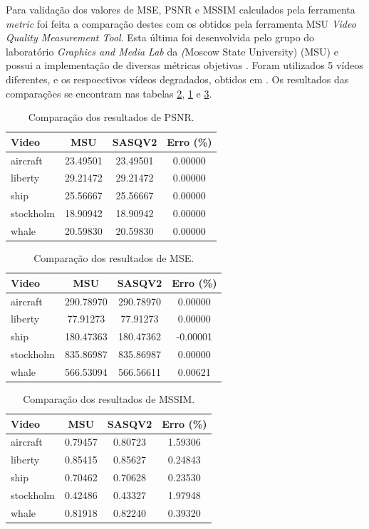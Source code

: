 Para validação dos valores de MSE, PSNR e MSSIM calculados pela ferramenta \emph{metric} foi feita a comparação destes com os obtidos pela ferramenta MSU \emph{Video Quality Measurement Tool}.
Esta última foi desenvolvida pelo grupo do laboratório \emph{Graphics and Media Lab} da \emph(Moscow State University) (MSU) e possui a implementação de diversas métricas objetivas \cite{moscowuniversity}.
Foram utilizados 5 vídeos diferentes, e os respoectivos vídeos degradados,  obtidos em \cite{}. Os resultados das comparações se encontram nas tabelas \ref{res:mse}, \ref{res:psnr} e \ref{res:mssim}.

\begin{table}[!htb]
	\centering
	\caption{Comparação dos resultados de PSNR.}
	\label{res:psnr}
	\begin{tabular}{lccc}
		\hline
		Video	 & MSU	 & SASQV2	 & Erro (\%) \\ \hline
		aircraft	 & 23.49501 & 23.49501 & 0.00000	 \\ 
		liberty	 & 29.21472 & 29.21472 & 0.00000	 \\ 
		ship	 & 25.56667 & 25.56667 & 0.00000	 \\ 
		stockholm & 18.90942 & 18.90942 & 0.00000	 \\ 
		whale	 & 20.59830 & 20.59830 & 0.00000	 \\
	\hline
	\end{tabular}
\end{table}

\begin{table}[!htb]
	\centering
	\caption{Comparação dos resultados de MSE.}
	\label{res:mse}
	\begin{tabular}{lccc}
	\hline
	Video	 & MSU	 & SASQV2	 & Erro (\%) \\ \hline
	aircraft	 & 290.78970 & 290.78970 & 0.00000	 \\ 
	liberty	 & 77.91273	 & 77.91273	 & 0.00000	 \\ 
	ship	 & 180.47363 & 180.47362 & -0.00001 \\ 
	stockholm & 835.86987 & 835.86987 & 0.00000	 \\ 
	whale	 & 566.53094 & 566.56611 & 0.00621	 \\
	\hline
	\end{tabular}
\end{table}

\begin{table}[!htb]
	\centering
	\caption{Comparação dos resultados de MSSIM.}
	\label{res:mssim}
	\begin{tabular}{lccc}
	\hline
	Video	 & MSU	 & SASQV2	 & Erro (\%) \\ \hline
	aircraft	 & 0.79457 & 0.80723 & 1.59306	 \\
	liberty	 & 0.85415 & 0.85627 & 0.24843	 \\
	ship	 & 0.70462 & 0.70628 & 0.23530	 \\ 
	stockholm & 0.42486 & 0.43327 & 1.97948	 \\ 
	whale	 & 0.81918 & 0.82240 & 0.39320	 \\
	\hline
	\end{tabular}
\end{table}

